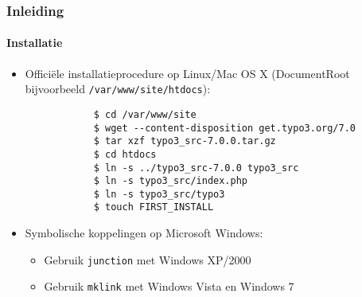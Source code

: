 \begin{frame}[fragile]
	\frametitle{Inleiding}
	\framesubtitle{Installatie}

	\begin{itemize}
		\item Officiële installatieprocedure op Linux/Mac OS X\newline
			(DocumentRoot bijvoorbeeld \texttt{/var/www/site/htdocs}):
		\begin{lstlisting}
			$ cd /var/www/site
			$ wget --content-disposition get.typo3.org/7.0
			$ tar xzf typo3_src-7.0.0.tar.gz
			$ cd htdocs
			$ ln -s ../typo3_src-7.0.0 typo3_src
			$ ln -s typo3_src/index.php
			$ ln -s typo3_src/typo3
			$ touch FIRST_INSTALL
		\end{lstlisting}

		\item Symbolische koppelingen op Microsoft Windows:

			\begin{itemize}
				\item Gebruik \texttt{junction} met Windows XP/2000
				\item Gebruik \texttt{mklink} met Windows Vista en Windows 7
			\end{itemize}

	\end{itemize}
\end{frame}


